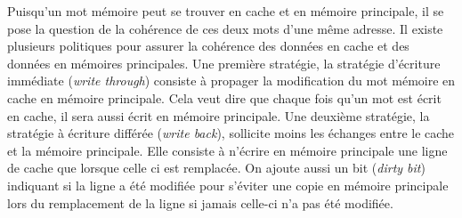 Puisqu'un mot mémoire peut se trouver en cache et en mémoire principale, il se pose la question de la cohérence de ces deux mots d'une même adresse. Il existe plusieurs politiques pour assurer la cohérence des données en cache et des données en mémoires principales. Une première stratégie, la stratégie d'écriture immédiate (\emph{write through}) consiste à propager la modification du mot mémoire en cache en mémoire principale. Cela veut dire que chaque fois qu'un mot est écrit en cache, il sera aussi écrit en mémoire principale. Une deuxième stratégie, la stratégie à écriture différée (\emph{write back}), sollicite moins les échanges entre le cache et la mémoire principale. Elle consiste à n'écrire en mémoire principale une ligne de cache que lorsque celle ci est remplacée. On ajoute aussi un bit (\emph{dirty bit}) indiquant si la ligne a été modifiée pour s'éviter une copie en mémoire principale lors du remplacement de la ligne si jamais celle-ci n'a pas été modifiée.


